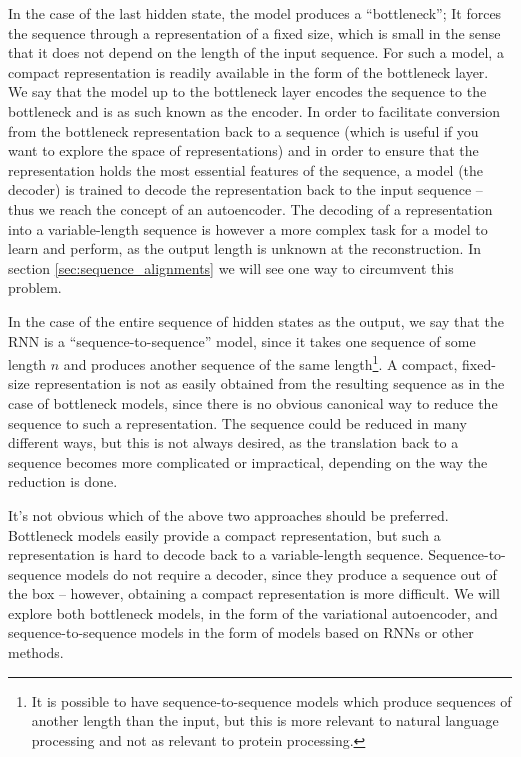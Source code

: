 In the case of the last hidden state, the model produces a ``bottleneck''; It forces the sequence through a representation of a fixed size, which is small in the sense that it does not depend on the length of the input sequence. For such a model, a compact representation is readily available in the form of the bottleneck layer. We say that the model up to the bottleneck layer encodes the sequence to the bottleneck and is as such known as the encoder. In order to facilitate conversion from the bottleneck representation back to a sequence (which is useful if you want to explore the space of representations) and in order to ensure that the representation holds the most essential features of the sequence, a model (the decoder) is trained to decode the representation back to the input sequence -- thus we reach the concept of an autoencoder. The decoding of a representation into a variable-length sequence is however a more complex task for a model to learn and perform, as the output length is unknown at the reconstruction. In section \ref{sec:sequence_alignments} we will see one way to circumvent this problem.

In the case of the entire sequence of hidden states as the output, we say that the RNN is a ``sequence-to-sequence'' model, since it takes one sequence of some length $n$ and produces another sequence of the same length\footnote{It is possible to have sequence-to-sequence models which produce sequences of another length than the input, but this is more relevant to natural language processing and not as relevant to protein processing.}. A compact, fixed-size representation is not as easily obtained from the resulting sequence as in the case of bottleneck models, since there is no obvious canonical way to reduce the sequence to such a representation. The sequence could be reduced in many different ways, but this is not always desired, as the translation back to a sequence becomes more complicated or impractical, depending on the way the reduction is done.

It's not obvious which of the above two approaches should be preferred. Bottleneck models easily provide a compact representation, but such a representation is hard to decode back to a variable-length sequence. Sequence-to-sequence models do not require a decoder, since they produce a sequence out of the box -- however, obtaining a compact representation is more difficult. We will explore both bottleneck models, in the form of the variational autoencoder, and sequence-to-sequence models in the form of models based on RNNs or other methods.


